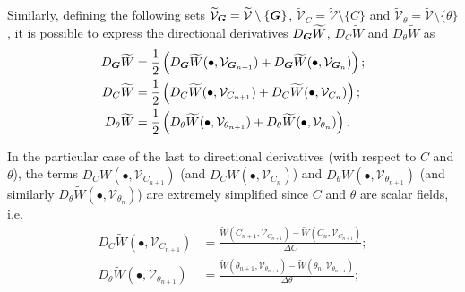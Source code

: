 Similarly, defining the following sets $\widetilde{\mathcal{V}}_{\boldsymbol{G}}=\widetilde{\mathcal{V}}\setminus\{\boldsymbol{G}\}$, $\widetilde{\mathcal{V}}_{C}=\widetilde{\mathcal{V}}\setminus\{{C}\}$ and $\widetilde{\mathcal{V}}_{\theta}=\widetilde{\mathcal{V}}\setminus\{\theta\}$, it is possible to express the directional derivatives $D_{\boldsymbol{G}}\widetilde{W}$, $D_{{C}}\widetilde{W}$ and $D_{{\theta}}\widetilde{W}$ as
%
\begin{equation}\label{eqn:discrete expression for remaining variables}
\begin{aligned}
D_{\vect{G}}\widetilde{W}&=\frac{1}{2}\left(D_{\vect{G}}\widetilde{W}(\bullet,\mathcal{V}_{\vect{G}_{n+1}}) + D_{\vect{G}}\widetilde{W}(\bullet,\mathcal{V}_{\vect{G}_n})\right);\\
%
D_{{C}}\widetilde{W}&=\frac{1}{2}\left(D_{{C}}\widetilde{W}(\bullet,\mathcal{V}_{C_{n+1}}) + D_{{C}}\widetilde{W}(\bullet,\mathcal{V}_{C_n})\right);\\
%
D_{{\theta}}\widetilde{W}&=\frac{1}{2}\left(D_{{\theta}}\widetilde{W}(\bullet,\mathcal{V}_{\theta_{n+1}}) + D_{{\theta}}\widetilde{W}(\bullet,\mathcal{V}_{\theta_n})\right).
%
\end{aligned}
\end{equation}

In the particular case of the last to directional derivatives (with respect to $C$ and $\theta$),  the terms $D_{{C}}\widetilde{W}(\bullet,\mathcal{V}_{C_{n+1}})$ (and $D_{{C}}\widetilde{W}(\bullet,\mathcal{V}_{C_{n}})$) and $D_{{\theta}}\widetilde{W}(\bullet,\mathcal{V}_{\theta_{n+1}})$ (and similarly $D_{{\theta}}\widetilde{W}(\bullet,\mathcal{V}_{\theta_{n}})$) are extremely simplified since $C$ and $\theta$ are scalar fields, i.e.
%
\begin{equation}
\begin{aligned}
D_{{C}}\widetilde{W}(\bullet,\mathcal{V}_{C_{n+1}}) & =  \frac{\widetilde{W}(C_{n+1},\mathcal{V}_{C_{n+1}})-\widetilde{W}(C_{n},\mathcal{V}_{C_{n+1}})}{\Delta C};\\
%
D_{{\theta}}\widetilde{W}(\bullet,\mathcal{V}_{\theta_{n+1}}) & =  \frac{\widetilde{W}(\theta_{n+1},\mathcal{V}_{\theta_{n+1}})-\widetilde{W}(\theta_{n},\mathcal{V}_{\theta_{n+1}})}{\Delta \theta};\\
%
\end{aligned}
\end{equation}



